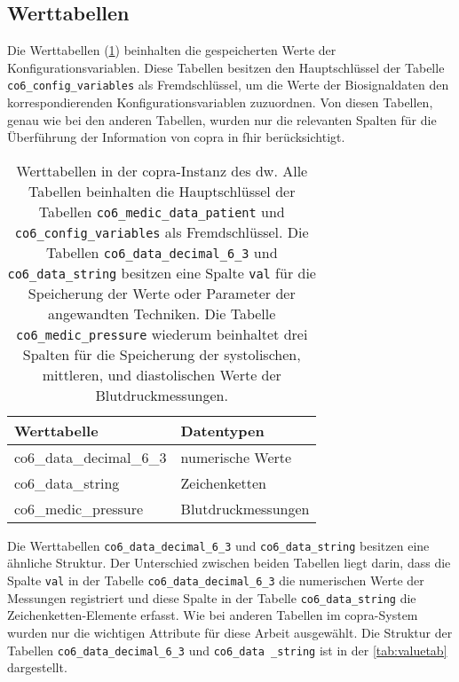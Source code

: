 \subsection{Werttabellen} \label{subsec:valuetables}

Die Werttabellen (\ref{tab:valuetable}) beinhalten die gespeicherten Werte der Konfigurationsvariablen. Diese Tabellen besitzen den Hauptschlüssel der Tabelle \texttt{co6\_config\_variables} als Fremdschlüssel, um die Werte der Biosignaldaten den korrespondierenden Konfigurationsvariablen zuzuordnen. Von diesen Tabellen, genau wie bei den anderen Tabellen, wurden nur die relevanten Spalten für die Überführung der Information von \ac{copra} in \ac{fhir} berücksichtigt.

\begin{table}[ht]
	\centering  
	\caption[Werttabellen in der \acs{copra}-Instanz]{Werttabellen in der \ac{copra}-Instanz des \ac{dw}. Alle Tabellen beinhalten die Hauptschlüssel der Tabellen \texttt{co6\_medic\_data\_patient} und \texttt{co6\_config\_variables} als Fremdschlüssel. Die Tabellen \texttt{co6\_data\_decimal\_6\_3} und \texttt{co6\_data\_string} besitzen eine Spalte \texttt{val} für die Speicherung der Werte oder Parameter der angewandten Techniken. Die Tabelle \texttt{co6\_medic\_pressure} wiederum beinhaltet drei Spalten für die Speicherung der systolischen, mittleren, und diastolischen Werte der Blutdruckmessungen.}
	\label{tab:valuetable}
	\begin{tabular}{|l|l|}
		\hline
		\rowcolor{lightgray} Werttabelle & Datentypen \\ \hline
		co6\_data\_decimal\_6\_3 & numerische Werte \\ \hline
		co6\_data\_string & Zeichenketten \\ \hline
		co6\_medic\_pressure & Blutdruckmessungen \\ \hline
	\end{tabular}
\end{table}

Die Werttabellen \texttt{co6\_data\_decimal\_6\_3} und \texttt{co6\_data\_string} besitzen eine ähnliche Struktur. Der Unterschied zwischen beiden Tabellen liegt darin, dass die Spalte \texttt{val} in der Tabelle \texttt{co6\_data\_decimal\_6\_3} die numerischen Werte der Messungen registriert und diese Spalte in der Tabelle \texttt{co6\_data\_string} die Zeichenketten-Elemente erfasst. Wie bei anderen Tabellen im \ac{copra}-System wurden nur die wichtigen Attribute für diese Arbeit ausgewählt. Die Struktur der Tabellen \texttt{co6\_data\_decimal\_6\_3} und \texttt{co6\_data \_string} ist in der \ref{tab:valuetab} dargestellt.

